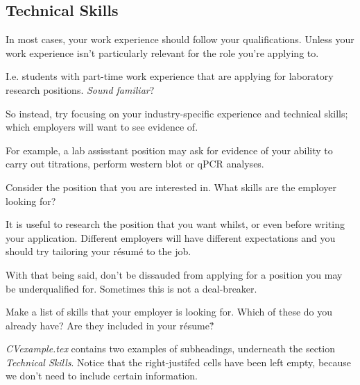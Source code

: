 \subsection{Technical Skills}
In most cases, your work experience should follow your qualifications. Unless your work experience isn't particularly relevant for the role you're applying to. \par

I.e. students with part-time work experience that are applying for laboratory research positions. \emph{Sound familiar}? \par

So instead, try focusing on your industry-specific experience and technical skills; which employers will want to see evidence of. \par

For example, a lab assisstant position may ask for evidence of your ability to carry out titrations, perform western blot or qPCR analyses. \par

\clearpage

Consider the position that you are interested in. What skills are the employer looking for? \par

It is useful to research the position that you want whilst, or even before writing your application. Different employers will have different expectations and you should try tailoring your r\'esum\'e to the job. \par

With that being said, don't be dissauded from applying for a position you may be underqualified for. Sometimes this is not a deal-breaker. \par

\begin{instrct}
Make a list of skills that your employer is looking for. Which of these do you already have? Are they included in your r\'esume\'?
\end{instrct}


\emph{CVexample.tex} contains two examples of subheadings, underneath the section \emph{Technical Skills}. Notice that the right-justifed cells have been left empty, because we don't need to include certain information. \par


